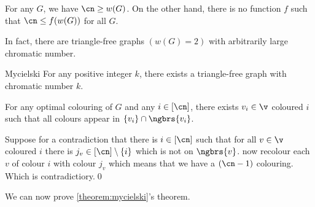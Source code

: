 \begin{customlemma}{6.9}
\label{lemma:6.9}
    For any $G$, we have $\cn \geq w(G)$. On the other hand, there is no function $f$ such that $\cn \leq f(w(G))$ for all $G$.
\end{customlemma}
In fact, there are triangle-free graphs $(w(G) = 2)$ with arbitrarily large chromatic number.
\begin{customtheorem}{Mycielski}
\label{theorem:mycielski}
    For any positive integer $k$, there exists a triangle-free graph with chromatic number $k$.
\end{customtheorem}
\begin{customlemma}{6.11}
\label{lemma:6.11}
    For any optimal colouring of $G$ and any $i \in [\cn]$, there exists $v_i \in \v$ coloured $i$ such that all colours appear in $\{v_i\} \cap \ngbrs{v_i}$.
\end{customlemma}
\begin{prf}
    Suppose for a contradiction that there is $i \in [\cn]$ such that for all $v \in \v$ coloured $i$ there is $j_v \in [\cn] \setminus \{i\}$ which is not on $\ngbrs{v}$. now recolour each $v$ of colour $i$ with colour $j_v$ which means that we have a $(\cn - 1)$ colouring. Which is contradictiory.\qed
\end{prf}
We can now prove \ref{theorem:mycielski}'s theorem.
